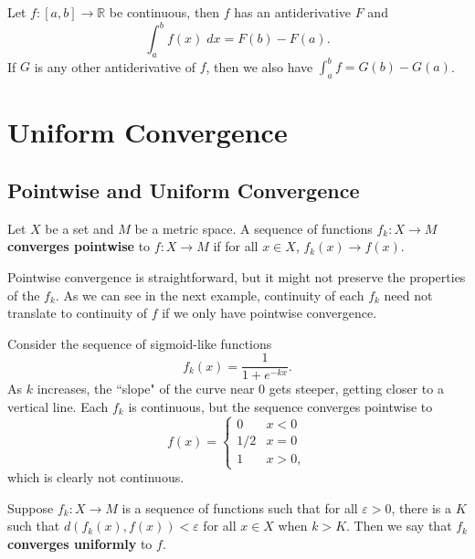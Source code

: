 \documentclass[10pt]{report}
\begin{document}
\begin{thrm}
	Let $f:[a,b]\to\mathbb{R}$ be continuous, then $f$ has an antiderivative $F$ and
	\[
		\int_{a}^{b} f(x) \;dx = F(b)-F(a).
	\] 
	If $G$ is any other antiderivative of $f$, then we also have $\int_{a}^{b} f = G(b)-G(a)$.
\end{thrm}


\chapter{Uniform Convergence}


\section{Pointwise and Uniform Convergence}

\begin{defn}[]
	Let $X$ be a set and $M$ be a metric space. A sequence of functions $f_k : X \to M$ \textbf{converges pointwise} to $f:X \to M$ if for all $x \in X$, $f_k(x) \to f(x)$.
\end{defn}

Pointwise convergence is straightforward, but it might not preserve the properties of the $f_k$. As we can see in the next example, continuity of each $f_k$ need not translate to continuity of $f$ if we only have pointwise convergence.

\begin{ex}{}{}
Consider the sequence of sigmoid-like functions
\[
	f_k(x) = \frac{1}{1+e^{-kx}} .
\] As $k$ increases, the ``slope" of the curve near 0 gets steeper, getting closer to a vertical line. Each $f_k$ is continuous, but the sequence converges pointwise to
\[
	f(x) =
	\begin{cases}
		0 & x < 0 \\
		1/2 & x=0 \\
		1 & x>0,
	\end{cases}
\] which is clearly not continuous.
\end{ex}

\begin{defn}[]
	Suppose $f_k : X \to M$ is a sequence of functions such that for all $\varepsilon>0$, there is a $K$ such that $d(f_k(x), f(x)) < \varepsilon$ for all $x \in X$ when $k > K$. Then we say that $f_k$ \textbf{converges uniformly} to $f$.
\end{defn}
\end{document}

